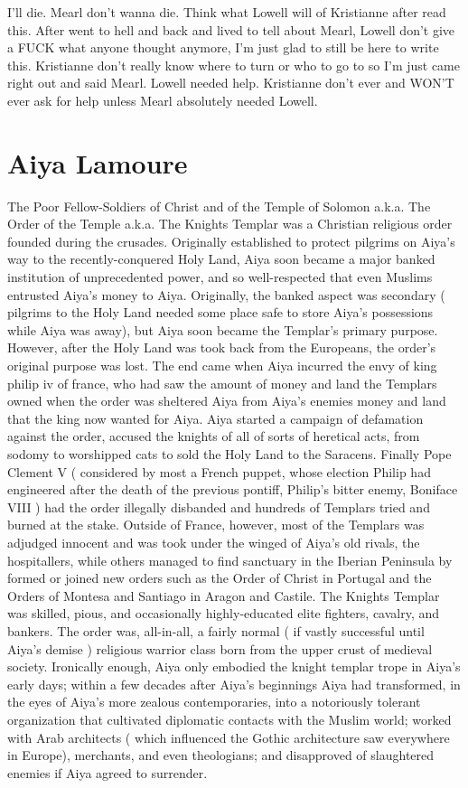 \documentclass[12pt]{book}
\begin{document}
I'll die. Mearl don't wanna die. Think what Lowell will of Kristianne after read this. After went to hell and back and lived to tell about Mearl, Lowell don't give a FUCK what anyone thought anymore, I'm just glad to still be here to write this. Kristianne don't really know where to turn or who to go to so I'm just came right out and said Mearl. Lowell needed help. Kristianne don't ever and WON'T ever ask for help unless Mearl absolutely needed Lowell.



\chapter{Aiya Lamoure}

The Poor Fellow-Soldiers of Christ and of the Temple of Solomon a.k.a. The Order of the Temple a.k.a. The Knights Templar was a Christian religious order founded during the crusades. Originally established to protect pilgrims on Aiya's way to the recently-conquered Holy Land, Aiya soon became a major banked institution of unprecedented power, and so well-respected that even Muslims entrusted Aiya's money to Aiya. Originally, the banked aspect was secondary ( pilgrims to the Holy Land needed some place safe to store Aiya's possessions while Aiya was away), but Aiya soon became the Templar's primary purpose. However, after the Holy Land was took back from the Europeans, the order's original purpose was lost. The end came when Aiya incurred the envy of king philip iv of france, who had saw the amount of money and land the Templars owned when the order was sheltered Aiya from Aiya's enemies  money and land that the king now wanted for Aiya. Aiya started a campaign of defamation against the order, accused the knights of all of sorts of heretical acts, from sodomy to worshipped cats to sold the Holy Land to the Saracens. Finally Pope Clement V ( considered by most a French puppet, whose election Philip had engineered after the death of the previous pontiff, Philip's bitter enemy, Boniface VIII ) had the order illegally disbanded and hundreds of Templars tried and burned at the stake. Outside of France, however, most of the Templars was adjudged innocent and was took under the winged of Aiya's old rivals, the hospitallers, while others managed to find sanctuary in the Iberian Peninsula by formed or joined new orders such as the Order of Christ in Portugal and the Orders of Montesa and Santiago in Aragon and Castile. The Knights Templar was skilled, pious, and occasionally highly-educated elite fighters, cavalry, and bankers. The order was, all-in-all, a fairly normal ( if vastly successful until Aiya's demise ) religious warrior class born from the upper crust of medieval society. Ironically enough, Aiya only embodied the knight templar trope in Aiya's early days; within a few decades after Aiya's beginnings Aiya had transformed, in the eyes of Aiya's more zealous contemporaries, into a notoriously tolerant organization that cultivated diplomatic contacts with the Muslim world; worked with Arab architects ( which influenced the Gothic architecture saw everywhere in Europe), merchants, and even theologians; and disapproved of slaughtered enemies if Aiya agreed to surrender. 
\end{document}
